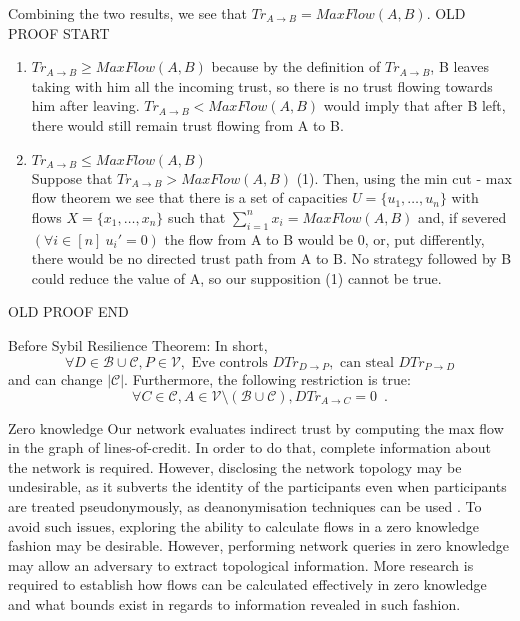        Combining the two results, we see that $Tr_{A \rightarrow B} = MaxFlow(A, B)$.
        OLD PROOF START
        \begin{enumerate}
           \item $Tr_{A \rightarrow B} \geq MaxFlow(A, B)$ because by the definition of $Tr_{A \rightarrow B}$,
           B leaves taking with him all the incoming trust, so there is no trust flowing towards him after leaving.
           $Tr_{A \rightarrow B} < MaxFlow(A, B)$ would imply that after B left, there would still remain trust
           flowing from A to B.
           \item $Tr_{A \rightarrow B} \leq MaxFlow(A, B)$ \\
           Suppose that $Tr_{A \rightarrow B} > MaxFlow(A, B)$ (1). Then, using the min cut - max flow theorem we
           see that there is a set of capacities $U= \{u_1,\dots,u_n\}$ with flows $X = \{x_1,\dots,x_n\}$ such that
           $\sum\limits_{i=1}^{n}{x_i} = MaxFlow(A, B)$ and, if severed $(\forall i \in [n] \: u_i' = 0)$
           the flow from A to B would be $0$, or, put differently, there would be no directed trust path from A to B. No
           strategy followed by B could reduce the value of A, so our supposition (1) cannot be true.
        \end{enumerate}
        OLD PROOF END

Before Sybil Resilience Theorem:
    In short,
    \begin{equation}
      \forall D \in \mathcal{B} \cup \mathcal{C}, P \in \mathcal{V}, \mbox{ Eve controls } DTr_{D \rightarrow P}, \mbox{ can
      steal } DTr_{P \rightarrow D}
    \end{equation}
    and can change $|\mathcal{C}|$.
    Furthermore, the following restriction is true:
    \begin{equation}
       \forall C \in \mathcal{C}, A \in \mathcal{V} \setminus \left(\mathcal{B} \cup \mathcal{C}\right), DTr_{A \rightarrow
       C} = 0 \enspace.
    \end{equation}

Zero knowledge
     Our network evaluates indirect trust by computing the max flow in the graph of lines-of-credit. In order to do that,
     complete information about the network is required. However, disclosing the network topology may be undesirable, as it
     subverts the identity of the participants even when participants are treated pseudonymously, as deanonymisation
     techniques can be used \cite{deanonymisation}. To avoid such issues, exploring the ability to calculate flows in a zero
     knowledge fashion may be desirable. However, performing network queries in zero knowledge may allow an adversary to
     extract topological information. More research is required to establish how flows can be calculated effectively in zero
     knowledge and what bounds exist in regards to information revealed in such fashion.

